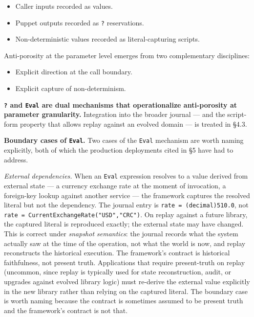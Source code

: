 \documentclass[
]{article}
\providecommand{\tightlist}{%
  \setlength{\itemsep}{0pt}\setlength{\parskip}{0pt}}
\let\origtexttt\texttt%
\renewcommand{\texttt}[1]{\origtexttt{\seqsplit{#1}}}%
\let\texttt\origtexttt%
\begin{document}
\begin{itemize}
\tightlist
\item
  Caller inputs recorded as values.
\item
  Puppet outputs recorded as \texttt{?} reservations.
\item
  Non-deterministic values recorded as literal-capturing scripts.
\end{itemize}

Anti-porosity at the parameter level emerges from two complementary
disciplines:

\begin{itemize}
\tightlist
\item
  Explicit direction at the call boundary.
\item
  Explicit capture of non-determinism.
\end{itemize}

\textbf{\texttt{?} and \texttt{Eval} are dual mechanisms that
operationalize anti-porosity at parameter granularity.} Integration into
the broader journal --- and the script-form property that allows replay
against an evolved domain --- is treated in §4.3.

\textbf{Boundary cases of \texttt{Eval}.} Two cases of the \texttt{Eval}
mechanism are worth naming explicitly, both of which the production
deployments cited in §5 have had to address.

\emph{External dependencies.} When an \texttt{Eval} expression resolves
to a value derived from external state --- a currency exchange rate at
the moment of invocation, a foreign-key lookup against another service
--- the framework captures the resolved literal but not the dependency.
The journal entry is \texttt{rate\ =\ (decimal)510.0}, not
\texttt{rate\ =\ CurrentExchangeRate("USD","CRC")}. On replay against a
future library, the captured literal is reproduced exactly; the external
state may have changed. This is correct under \emph{snapshot semantics}:
the journal records what the system actually saw at the time of the
operation, not what the world is now, and replay reconstructs the
historical execution. The framework's contract is historical
faithfulness, not present truth. Applications that require present-truth
on replay (uncommon, since replay is typically used for state
reconstruction, audit, or upgrades against evolved library logic) must
re-derive the external value explicitly in the new library rather than
relying on the captured literal. The boundary case is worth naming
because the contract is sometimes assumed to be present truth and the
framework's contract is not that.
\end{document}
